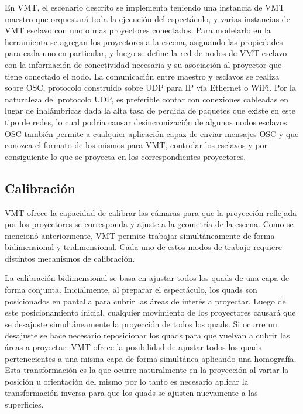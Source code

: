 En VMT, el escenario descrito se implementa teniendo una instancia de VMT maestro que orquestará toda la ejecución del espectáculo, y varias instancias de VMT esclavo con uno o mas proyectores conectados. Para modelarlo en la herramienta se agregan los proyectores a la escena, asignando las propiedades para cada uno en particular, y luego se define la red de nodos de VMT esclavo con la información de conectividad necesaria y su asociación al proyector que tiene conectado el nodo. La comunicación entre maestro y esclavos se realiza sobre OSC, protocolo construido sobre UDP para IP vía Ethernet o WiFi. Por la naturaleza del protocolo UDP, es preferible contar con conexiones cableadas en lugar de inalámbricas dada la alta tasa de perdida de paquetes que existe en este tipo de redes, lo cual podría causar desincronización de algunos nodos esclavos. OSC también permite a cualquier aplicación capaz de enviar mensajes OSC y que conozca el formato de los mismos para VMT, controlar los esclavos y por consiguiente lo que se proyecta en los correspondientes proyectores.

\subsection{Calibración}

VMT ofrece la capacidad de calibrar las cámaras para que la proyección reflejada por los proyectores se corresponda y ajuste a la geometría de la escena.
Como se mencionó anteriormente, VMT permite trabajar simultáneamente de forma bidimensional y tridimensional. Cada uno de estos modos de trabajo requiere distintos mecanismos de calibración.

La calibración bidimensional se basa en ajustar todos los quads de una capa de forma conjunta.
Inicialmente, al preparar el espectáculo, los quads son posicionados en pantalla para cubrir las áreas de interés a proyectar. Luego de este posicionamiento inicial, cualquier movimiento de los proyectores causará que se desajuste simultáneamente la proyección de todos los quads. Si ocurre un desajuste se hace necesario reposicionar los quads para que vuelvan a cubrir las áreas a proyectar.
VMT ofrece la posibilidad de ajustar todos los quads pertenecientes a una misma capa de forma simultánea aplicando una homografía. Esta transformación es la que ocurre naturalmente en la proyección al variar la posición u orientación del mismo por lo tanto es necesario aplicar la transformación inversa para que los quads se ajusten nuevamente a las superficies.

